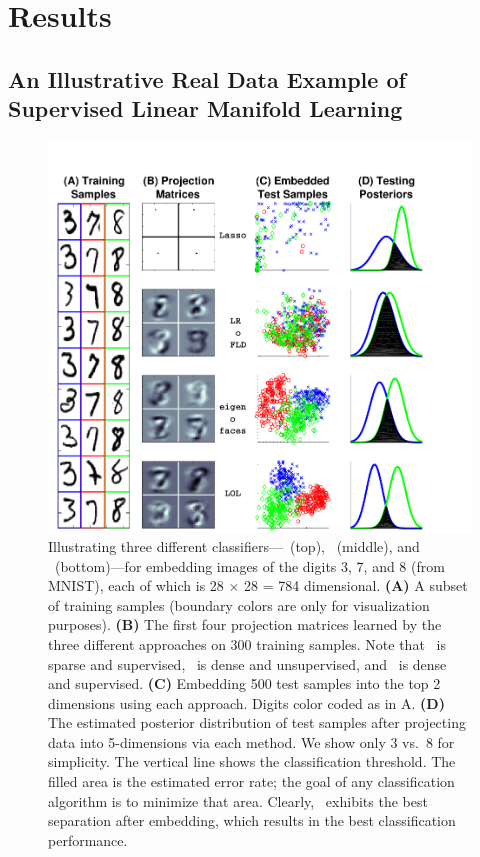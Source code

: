 \documentclass[10pt]{article}
\begin{document}
\section*{Results}

\subsection*{An Illustrative Real Data Example of Supervised Linear Manifold Learning}



\begin{figure}
\centering %
\includegraphics[width=0.7\linewidth,trim=1cm 0cm 0cm 1.0cm,clip=true]{../Figs/mnist}
\caption{
Illustrating three different classifiers---~(top), ~(middle), and \Lol~(bottom)---for embedding images of the digits 3, 7, and 8 (from MNIST), each of which is 28 $\times$ 28 = 784 dimensional.
\textbf{(A)} A subset of training samples  (boundary colors are only for visualization purposes).
\textbf{(B)} The first four projection matrices learned by the three different approaches on 300 training samples. Note that ~is sparse and supervised, \Pca~is dense and unsupervised, and \Lol~is dense and supervised.
\textbf{(C)} Embedding 500 test samples into the top 2 dimensions using each approach.  Digits color coded as in A.
\textbf{(D)}  The estimated posterior distribution of test samples after
projecting data into 5-dimensions via each method.
We show only 3 vs.~8 for simplicity.
The vertical line shows the classification threshold.
The filled area is the estimated error rate; the goal of any classification algorithm is to minimize that area.
Clearly, \Lol~exhibits the best separation after embedding, which results in the best classification performance.
}
\label{f:mnist}
\end{figure}
\end{document}

